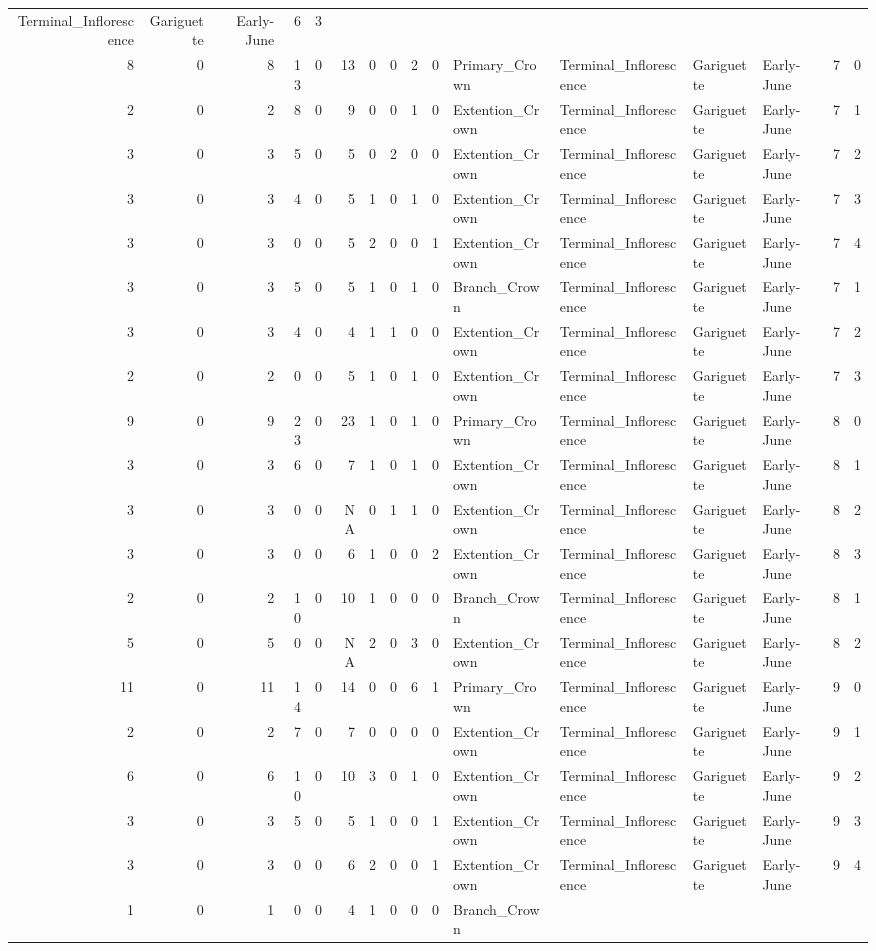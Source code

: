 \documentclass[]{article}
\begin{document}
\begin{longtable}[]{@{}rrrrrrrrrrllllrl@{}}
Terminal\_Inflorescence & Gariguette & Early-June & 6 & 3\tabularnewline
8 & 0 & 8 & 13 & 0 & 13 & 0 & 0 & 2 & 0 & Primary\_Crown &
Terminal\_Inflorescence & Gariguette & Early-June & 7 & 0\tabularnewline
2 & 0 & 2 & 8 & 0 & 9 & 0 & 0 & 1 & 0 & Extention\_Crown &
Terminal\_Inflorescence & Gariguette & Early-June & 7 & 1\tabularnewline
3 & 0 & 3 & 5 & 0 & 5 & 0 & 2 & 0 & 0 & Extention\_Crown &
Terminal\_Inflorescence & Gariguette & Early-June & 7 & 2\tabularnewline
3 & 0 & 3 & 4 & 0 & 5 & 1 & 0 & 1 & 0 & Extention\_Crown &
Terminal\_Inflorescence & Gariguette & Early-June & 7 & 3\tabularnewline
3 & 0 & 3 & 0 & 0 & 5 & 2 & 0 & 0 & 1 & Extention\_Crown &
Terminal\_Inflorescence & Gariguette & Early-June & 7 & 4\tabularnewline
3 & 0 & 3 & 5 & 0 & 5 & 1 & 0 & 1 & 0 & Branch\_Crown &
Terminal\_Inflorescence & Gariguette & Early-June & 7 & 1\tabularnewline
3 & 0 & 3 & 4 & 0 & 4 & 1 & 1 & 0 & 0 & Extention\_Crown &
Terminal\_Inflorescence & Gariguette & Early-June & 7 & 2\tabularnewline
2 & 0 & 2 & 0 & 0 & 5 & 1 & 0 & 1 & 0 & Extention\_Crown &
Terminal\_Inflorescence & Gariguette & Early-June & 7 & 3\tabularnewline
9 & 0 & 9 & 23 & 0 & 23 & 1 & 0 & 1 & 0 & Primary\_Crown &
Terminal\_Inflorescence & Gariguette & Early-June & 8 & 0\tabularnewline
3 & 0 & 3 & 6 & 0 & 7 & 1 & 0 & 1 & 0 & Extention\_Crown &
Terminal\_Inflorescence & Gariguette & Early-June & 8 & 1\tabularnewline
3 & 0 & 3 & 0 & 0 & NA & 0 & 1 & 1 & 0 & Extention\_Crown &
Terminal\_Inflorescence & Gariguette & Early-June & 8 & 2\tabularnewline
3 & 0 & 3 & 0 & 0 & 6 & 1 & 0 & 0 & 2 & Extention\_Crown &
Terminal\_Inflorescence & Gariguette & Early-June & 8 & 3\tabularnewline
2 & 0 & 2 & 10 & 0 & 10 & 1 & 0 & 0 & 0 & Branch\_Crown &
Terminal\_Inflorescence & Gariguette & Early-June & 8 & 1\tabularnewline
5 & 0 & 5 & 0 & 0 & NA & 2 & 0 & 3 & 0 & Extention\_Crown &
Terminal\_Inflorescence & Gariguette & Early-June & 8 & 2\tabularnewline
11 & 0 & 11 & 14 & 0 & 14 & 0 & 0 & 6 & 1 & Primary\_Crown &
Terminal\_Inflorescence & Gariguette & Early-June & 9 & 0\tabularnewline
2 & 0 & 2 & 7 & 0 & 7 & 0 & 0 & 0 & 0 & Extention\_Crown &
Terminal\_Inflorescence & Gariguette & Early-June & 9 & 1\tabularnewline
6 & 0 & 6 & 10 & 0 & 10 & 3 & 0 & 1 & 0 & Extention\_Crown &
Terminal\_Inflorescence & Gariguette & Early-June & 9 & 2\tabularnewline
3 & 0 & 3 & 5 & 0 & 5 & 1 & 0 & 0 & 1 & Extention\_Crown &
Terminal\_Inflorescence & Gariguette & Early-June & 9 & 3\tabularnewline
3 & 0 & 3 & 0 & 0 & 6 & 2 & 0 & 0 & 1 & Extention\_Crown &
Terminal\_Inflorescence & Gariguette & Early-June & 9 & 4\tabularnewline
1 & 0 & 1 & 0 & 0 & 4 & 1 & 0 & 0 & 0 & Branch\_Crown &

\end{longtable}
\end{document}
